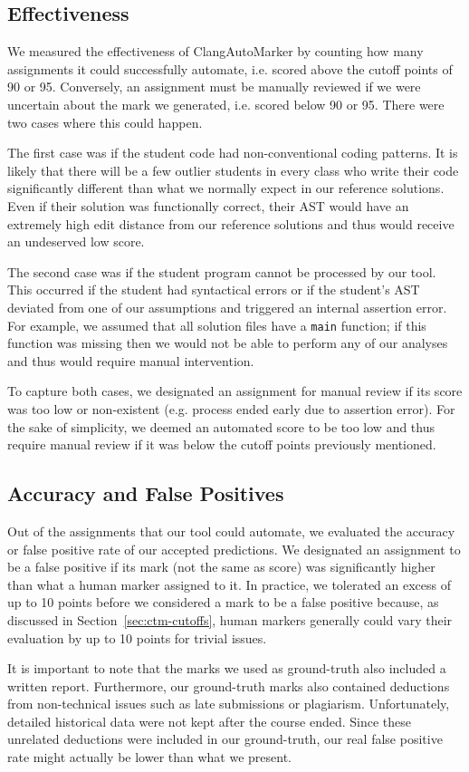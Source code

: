 \subsection{Effectiveness}

We measured the effectiveness of ClangAutoMarker by counting how many assignments it could successfully automate, i.e. scored above the cutoff points of 90 or 95. Conversely, an assignment must be manually reviewed if we were uncertain about the mark we generated, i.e. scored below 90 or 95. There were two cases where this could happen.

The first case was if the student code had non-conventional coding patterns. It is likely that there will be a few outlier students in every class who write their code significantly different than what we normally expect in our reference solutions. Even if their solution was functionally correct, their AST would have an extremely high edit distance from our reference solutions and thus would receive an undeserved low score.

The second case was if the student program cannot be processed by our tool. This occurred if the student had syntactical errors or if the student's AST deviated from one of our assumptions and triggered an internal assertion error. For example, we assumed that all solution files have a \texttt{main} function; if this function was missing then we would not be able to perform any of our analyses and thus would require manual intervention.

To capture both cases, we designated an assignment for manual review if its score was too low or non-existent (e.g. process ended early due to assertion error). For the sake of simplicity, we deemed an automated score to be too low and thus require manual review if it was below the cutoff points previously mentioned.

\subsection{Accuracy and False Positives}

Out of the assignments that our tool could automate, we evaluated the accuracy or false positive rate of our accepted predictions. We designated an assignment to be a false positive if its mark (not the same as score) was significantly higher than what a human marker assigned to it. In practice, we tolerated an excess of up to 10 points before we considered a mark to be a false positive because, as discussed in Section~\ref{sec:ctm-cutoffs}, human markers generally could vary their evaluation by up to 10 points for trivial issues.

It is important to note that the marks we used as ground-truth also included a written report. Furthermore, our ground-truth marks also contained deductions from non-technical issues such as late submissions or plagiarism. Unfortunately, detailed historical data were not kept after the course ended. Since these unrelated deductions were included in our ground-truth, our real false positive rate might actually be lower than what we present.
